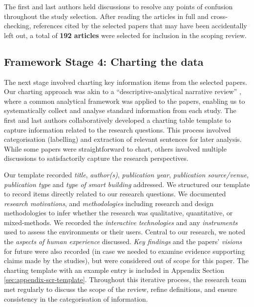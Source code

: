 The first and last authors held discussions to resolve any points of confusion throughout the study selection. After reading the articles in full and cross-checking, references cited by the selected papers that may have been accidentally left out, a total of \textbf{192 articles} were selected for inclusion in the scoping review. 

\subsection{Framework Stage 4: Charting the data}
The next stage involved charting key information items from the selected papers. Our charting approach was akin to a ``descriptive-analytical narrative review'' \cite{arksey2005scoping}, where a common analytical framework was applied to the papers, enabling us to systematically collect and analyse standard information from each study. The first and last authors collaboratively developed a charting table template to capture information related to the research questions. This process involved categorisation (labelling) and extraction of relevant sentences for later analysis. While some papers were straightforward to chart, others involved multiple discussions to satisfactorily capture the research perspectives. 


Our template recorded \textit{title}, \textit{author(s)}, \textit{publication year}, \textit{publication source/venue}, \textit{publication type} and \textit{type of smart building} addressed. We structured our template to record items directly related to our research questions. We documented \textit{research motivations}, and \textit{methodologies} including research and design methodologies to infer whether the research was qualitative, quantitative, or mixed-methods. We recorded the \textit{interactive technologies} and any \textit{instruments} used to assess the environments or their users. Central to our research, we noted the \textit{aspects of human experience} discussed. \textit{Key findings} and the papers' \textit{visions} for future were also recorded (in case we needed to examine evidence supporting claims made by the studies), but were considered out of scope for this paper. The charting template with an example entry is included in Appendix Section \ref{sec:appendix-scr-template}. Throughout this iterative process, the research team met regularly to discuss the scope of the review, refine definitions, and ensure consistency in the categorisation of information.


